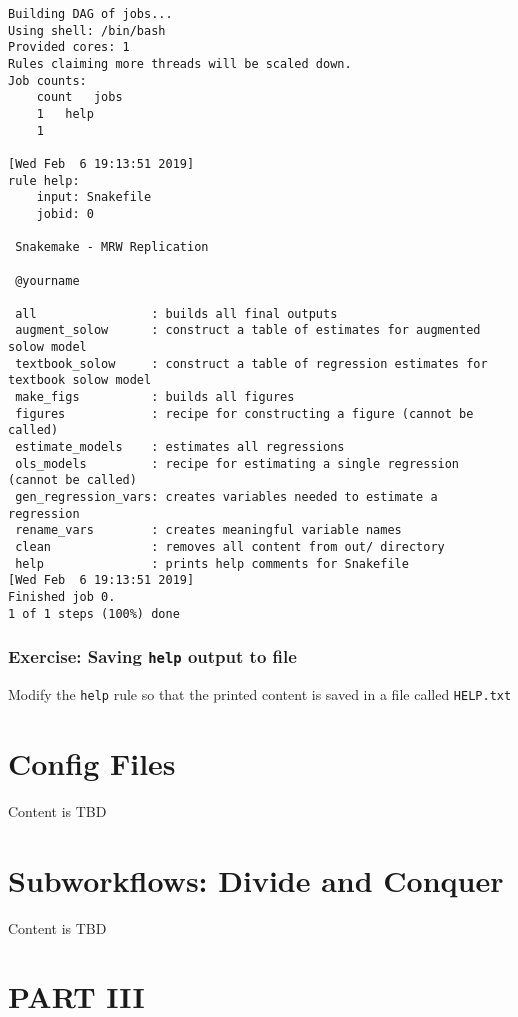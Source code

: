 \documentclass[]{book}
\theoremstyle{definition}
\theoremstyle{definition}
\theoremstyle{definition}
\theoremstyle{remark}
\begin{document}
\begin{verbatim}
Building DAG of jobs...
Using shell: /bin/bash
Provided cores: 1
Rules claiming more threads will be scaled down.
Job counts:
    count   jobs
    1   help
    1

[Wed Feb  6 19:13:51 2019]
rule help:
    input: Snakefile
    jobid: 0

 Snakemake - MRW Replication

 @yourname

 all                : builds all final outputs
 augment_solow      : construct a table of estimates for augmented solow model
 textbook_solow     : construct a table of regression estimates for textbook solow model
 make_figs          : builds all figures
 figures            : recipe for constructing a figure (cannot be called)
 estimate_models    : estimates all regressions
 ols_models         : recipe for estimating a single regression (cannot be called)
 gen_regression_vars: creates variables needed to estimate a regression
 rename_vars        : creates meaningful variable names
 clean              : removes all content from out/ directory
 help               : prints help comments for Snakefile
[Wed Feb  6 19:13:51 2019]
Finished job 0.
1 of 1 steps (100%) done
\end{verbatim}

\subsection*{\texorpdfstring{Exercise: Saving \texttt{help} output to
file}{Exercise: Saving help output to file}}\label{exercise-saving-help-output-to-file}

Modify the \texttt{help} rule so that the printed content is saved in a
file called \texttt{HELP.txt}

\chapter{Config Files}\label{config-files}

Content is TBD

\chapter{Subworkflows: Divide and
Conquer}\label{subworkflows-divide-and-conquer}

Content is TBD

\chapter*{PART III}\label{part-iii}
\end{document}
